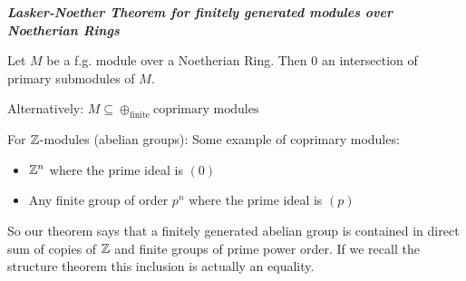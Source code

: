 \begin{theorem}\textit{\textbf{Lasker-Noether Theorem for finitely generated modules over Noetherian Rings}}

    Let $M$ be a f.g. module over a Noetherian Ring. Then $0$ an intersection of primary submodules of $M$. 

    Alternatively: $M\subseteq \oplus_{\text{finite}} \text{coprimary modules}$
\end{theorem}
\begin{example}
    For $\mathbb{Z}$-modules (abelian groups): Some example of coprimary modules:\begin{itemize}
        \item $\mathbb{Z}^n$ where the prime ideal is $(0)$
        \item Any finite group of order $p^n$ where the prime ideal is $(p)$
    \end{itemize}
    So our theorem says that a finitely generated abelian group is contained in direct sum of copies of $\mathbb{Z}$ and finite groups of prime power order. If we recall the structure theorem this inclusion is actually an equality.        
\end{example}

